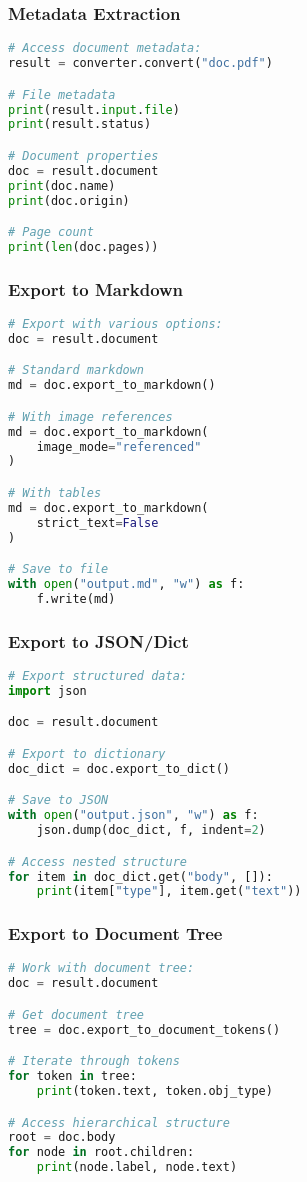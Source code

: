 \begin{frame}[fragile]\frametitle{Metadata Extraction}
\begin{lstlisting}[language=python,basicstyle=\tiny]
# Access document metadata:
result = converter.convert("doc.pdf")

# File metadata
print(result.input.file)
print(result.status)

# Document properties
doc = result.document
print(doc.name)
print(doc.origin)

# Page count
print(len(doc.pages))
\end{lstlisting}
\end{frame}

\begin{frame}[fragile]\frametitle{Export to Markdown}
\begin{lstlisting}[language=python,basicstyle=\tiny]
# Export with various options:
doc = result.document

# Standard markdown
md = doc.export_to_markdown()

# With image references
md = doc.export_to_markdown(
    image_mode="referenced"
)

# With tables
md = doc.export_to_markdown(
    strict_text=False
)

# Save to file
with open("output.md", "w") as f:
    f.write(md)
\end{lstlisting}
\end{frame}

\begin{frame}[fragile]\frametitle{Export to JSON/Dict}
\begin{lstlisting}[language=python,basicstyle=\tiny]
# Export structured data:
import json

doc = result.document

# Export to dictionary
doc_dict = doc.export_to_dict()

# Save to JSON
with open("output.json", "w") as f:
    json.dump(doc_dict, f, indent=2)

# Access nested structure
for item in doc_dict.get("body", []):
    print(item["type"], item.get("text"))
\end{lstlisting}
\end{frame}

\begin{frame}[fragile]\frametitle{Export to Document Tree}
\begin{lstlisting}[language=python,basicstyle=\tiny]
# Work with document tree:
doc = result.document

# Get document tree
tree = doc.export_to_document_tokens()

# Iterate through tokens
for token in tree:
    print(token.text, token.obj_type)

# Access hierarchical structure
root = doc.body
for node in root.children:
    print(node.label, node.text)
\end{lstlisting}
\end{frame}

